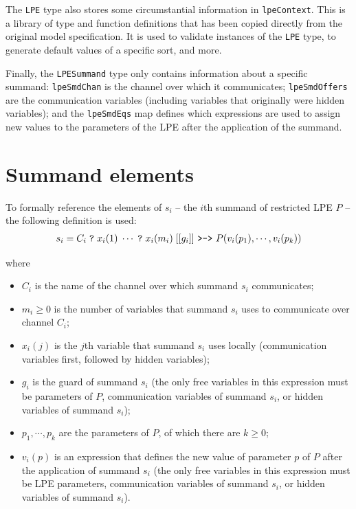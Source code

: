 The \texttt{LPE} type also stores some circumstantial information in \texttt{lpeContext}.
This is a library of \txs{} type and function definitions that has been copied directly from the original \txs{} model specification.
It is used to validate instances of the \texttt{LPE} type, to generate default values of a specific sort, and more.

Finally, the \texttt{LPESummand} type only contains information about a specific summand: \texttt{lpeSmdChan} is the channel over which it communicates; \texttt{lpeSmdOffers} are the communication variables (including variables that originally were hidden variables); and the \texttt{lpeSmdEqs} map defines which expressions are used to assign new values to the parameters of the LPE after the application of the summand.

\section{Summand elements} \label{summandelements}

To formally reference the elements of $s_i$ -- the $i$th summand of restricted LPE $P$ -- the following definition is used:
\begin{align*}
s_i = C_i \; \texttt{?} \; x_i(1) \; \cdots{} \; \texttt{?} \; x_i(m_i) \; [[g_i]] \text{ \texttt{>->} } P(v_i(p_1), \cdots{}, v_i(p_k))
\end{align*}

where

\begin{itemize}
\item $C_i$ is the name of the channel over which summand $s_i$ communicates;
\item $m_i \geq 0$ is the number of variables that summand $s_i$ uses to communicate over channel $C_i$;
\item $x_i(j)$ is the $j$th variable that summand $s_i$ uses locally (communication variables first, followed by hidden variables);
\item $g_i$ is the guard of summand $s_i$ (the only free variables in this expression must be parameters of $P$, communication variables of summand $s_i$, or hidden variables of summand $s_i$);
\item $p_1, \cdots{}, p_k$ are the parameters of $P$, of which there are $k \geq 0$;
\item $v_i(p)$ is an expression that defines the new value of parameter $p$ of $P$ after the application of summand $s_i$ (the only free variables in this expression must be LPE parameters, communication variables of summand $s_i$, or hidden variables of summand $s_i$).
\end{itemize}

